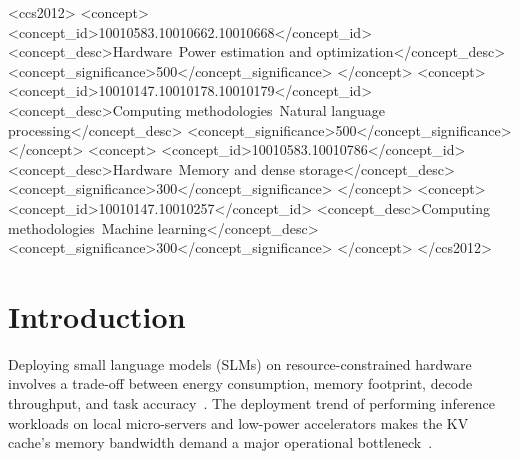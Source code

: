 \documentclass[sigconf,nonacm]{acmart}
\begin{document}
\begin{CCSXML}
<ccs2012>
   <concept>
       <concept_id>10010583.10010662.10010668</concept_id>
       <concept_desc>Hardware~Power estimation and optimization</concept_desc>
       <concept_significance>500</concept_significance>
   </concept>
   <concept>
       <concept_id>10010147.10010178.10010179</concept_id>
       <concept_desc>Computing methodologies~Natural language processing</concept_desc>
       <concept_significance>500</concept_significance>
   </concept>
   <concept>
       <concept_id>10010583.10010786</concept_id>
       <concept_desc>Hardware~Memory and dense storage</concept_desc>
       <concept_significance>300</concept_significance>
   </concept>
   <concept>
       <concept_id>10010147.10010257</concept_id>
       <concept_desc>Computing methodologies~Machine learning</concept_desc>
       <concept_significance>300</concept_significance>
   </concept>
</ccs2012>
\end{CCSXML}



\maketitle

\section{Introduction}

Deploying small language models (SLMs) on resource-constrained hardware involves a trade-off between energy consumption, memory footprint, decode throughput, and task accuracy~\cite{strubell_energy_2019,patterson_carbon_2021,schwartz2020green}. The deployment trend of performing inference workloads on local micro-servers and low-power accelerators makes the KV cache's memory bandwidth demand a major operational bottleneck~\cite{li2024survey}.
\end{document}
